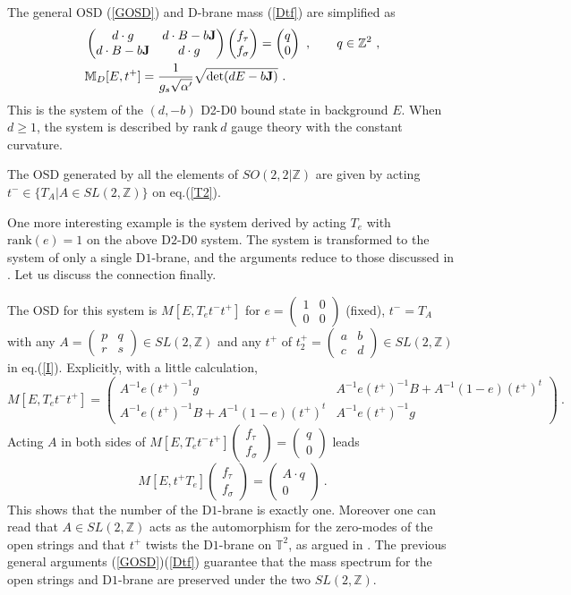 \documentclass[a4paper,12pt]{article}
\newcommand{\Z}{{\mathbb{Z}}}
\newcommand{\T}{{\mathbb{T}}}
\newcommand{\M}{{\mathbb{M}}}
\newcommand{\bp}{\begin{pmatrix}}
\newcommand{\ep}{\end{pmatrix}}
\newcommand{\bps}{\begin{smallmatrix}}
\newcommand{\eps}{\end{smallmatrix}}
\newcommand{\f}{\frac}
\def \J{{\bf J}}
\def \rank{\mathrm{rank}}
\def \ov#1{\frac{1}{#1}}
\def \l{{\frak l}}
\def \l({\left(}
\def \r){\right)}
\def \0{{\bf 0}}
\begin{document}
The general OSD (\ref{GOSD}) 
and D-brane mass (\ref{Dtf}) are simplified as 
\begin{equation}
 \begin{split}
 &\bp d\cdot g& d\cdot B -b\J\\ d\cdot B -b\J&d\cdot g \ep
 \bp f_\tau\\ f_\sigma\ep
 =\bp q \\ 0 \ep \ ,\qquad q\in\Z^2\ ,\\
 &\M_{D}[E, t^+]=\ov{g_s\sqrt{\alpha'}}\sqrt{\det(d E -b\J)}\ .
 \end{split}\label{T2}
\end{equation}
This is the system of the 
$(d, -b)$ D2-D0 bound state in background $E$. 
When $d\ge 1$, the system is described by $\rank\ d$ gauge theory with 
the constant curvature.

The OSD generated by all the elements of $SO(2,2|\Z)$ are 
given by acting $t^-\in\{T_A | A\in SL(2,\Z)\}$ on eq.(\ref{T2}). 

One more interesting example is the system derived by acting 
$T_e$ with $\rank (e)=1$ on the above D$2$-D$0$ system. 
The system is transformed to the system of 
only a single D$1$-brane, and the arguments reduce to those discussed in 
\cite{AAS}. Let us discuss the connection finally. 

The OSD for this system is $M[E, T_e t^-t^+]$ for   
\begin{math}e= \l(\bps 1&0\\0&0\eps\r)\end{math} (fixed),  
$t^-=T_A$ with any 
\begin{math}A= \l(\bps p&q\\r&s\eps\r)\in SL(2,\Z)\end{math} and any 
$t^+$ of \begin{math}t^+_2=
\l(\bps a&b\\c&d\eps\r)\in SL(2,\Z)\end{math} in eq.(\ref{I}). 
Explicitly, with a little calculation, 
\begin{equation*}
 M[E, T_e t^-t^+]=
 \bp A^{-1}e (t^+)^{-1}g & A^{-1}e (t^+)^{-1}B+A^{-1}(1-e)(t^+)^t\\
     A^{-1}e (t^+)^{-1}B+A^{-1}(1-e)(t^+)^t & A^{-1}e (t^+)^{-1}g \ep\ .
\end{equation*}
Acting $A$ in both sides of 
\begin{math} M[E, T_e t^-t^+]\bp f_\tau\\ f_\sigma\ep=\bp q\\0\ep\end{math}
 leads 
\begin{equation*}
  M[E, t^+T_e]\bp f_\tau\\f_\sigma\ep=\bp A\cdot q\\ 0\ep\ .
\end{equation*}
This shows that the number of the D$1$-brane is exactly one. Moreover 
one can read that 
$A\in SL(2,\Z)$ acts as the automorphism for the zero-modes 
of the open strings and that 
$t^+$ twists the D$1$-brane on $\T^2$, as argued in \cite{AAS}. 
The previous general arguments (\ref{GOSD})(\ref{Dtf}) guarantee 
that the mass spectrum for the open strings and D$1$-brane are 
preserved under the two $SL(2,\Z)$. 
\end{document}
